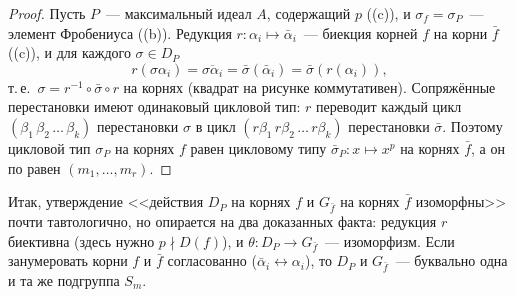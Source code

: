 \begin{proof}
Пусть $P$~--- максимальный идеал $A$, содержащий $p$ ((c)), и $\sigma_f=\sigma_P$~--- элемент Фробениуса
((b)). Редукция $r\colon\alpha_i\mapsto\bar\alpha_i$~--- биекция корней $f$ на корни $\bar f$ ((c)), и для каждого
$\sigma\in D_P$
\[
r(\sigma\alpha_i)=\overline{\sigma\alpha_i}=\bar\sigma(\bar\alpha_i)=\bar\sigma(r(\alpha_i)),
\]
т.\,е.\ $\sigma=r^{-1}\circ\bar\sigma\circ r$ на корнях (квадрат на рисунке коммутативен). Сопряжённые перестановки имеют
одинаковый цикловой тип: $r$ переводит каждый цикл $(\beta_1\,\beta_2\,\dots\,\beta_k)$ перестановки $\sigma$ в цикл
$(r\beta_1\,r\beta_2\,\dots\,r\beta_k)$ перестановки $\bar\sigma$. Поэтому цикловой тип $\sigma_P$ на корнях $f$ равен
цикловому типу $\bar\sigma_P\colon x\mapsto x^p$ на корнях $\bar f$, а он по  равен $(m_1,\dots,m_r)$.
\end{proof}

Итак, утверждение <<действия $D_P$ на корнях $f$ и $G_{\bar f}$ на корнях $\bar f$ изоморфны>> почти тавтологично, но
опирается на два доказанных факта: редукция $r$ биективна (здесь нужно $p\nmid D(f)$), и $\theta\colon D_P\to G_{\bar f}$~---
изоморфизм. Если занумеровать корни $f$ и $\bar f$ согласованно ($\bar\alpha_i\leftrightarrow\alpha_i$), то $D_P$ и
$G_{\bar f}$~--- буквально одна и та же подгруппа $S_m$.

